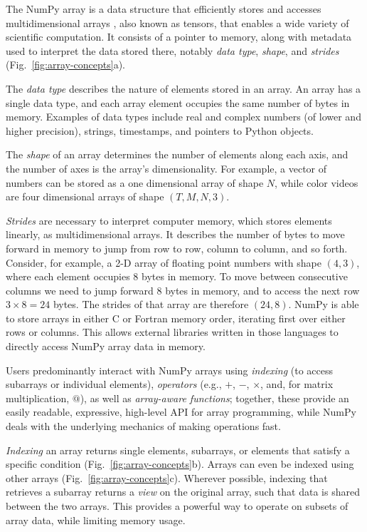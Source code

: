 The NumPy array is a data structure that efficiently stores and accesses
multidimensional arrays \cite{vanderwalt2011numpy}, also known as tensors, that
enables a wide variety of scientific computation.
It consists of a pointer to memory, along with metadata used to interpret the
data stored there, notably {\em data type}, {\em shape}, and {\em strides}
(Fig.~\ref{fig:array-concepts}a).

The \emph{data type} describes the nature of elements stored in an array.
An array has a single data type, and each array element occupies the same
number of bytes in memory.
Examples of data types include real and complex numbers (of lower and higher
precision), strings, timestamps, and pointers to Python objects.

The \emph{shape} of an array determines the number of elements along each axis,
and the number of axes is the array's dimensionality.
For example, a vector of numbers can be stored as a one dimensional array of
shape $N$, while color videos are four dimensional arrays of shape
$(T, M, N, 3)$.

\emph{Strides} are necessary to interpret computer memory, which stores elements
linearly, as multidimensional arrays.
It describes the number of bytes to move forward in memory to jump from row to
row, column to column, and so forth.
Consider, for example, a 2-D array of floating point numbers with shape
$(4, 3)$, where each element occupies 8 bytes in memory.
To move between consecutive columns we need to jump forward 8 bytes in memory,
and to access the next row $3 \times 8 = 24$ bytes.
The strides of that array are therefore $(24, 8)$.  NumPy is able to
store arrays in either C or Fortran memory order, iterating
first over either rows or columns.  This allows external libraries
written in those languages to directly access NumPy array data in memory.

Users predominantly interact with NumPy arrays using {\em indexing} (to access
subarrays or individual elements), {\em operators} (e.g., $+$, $-$, $\times$,
and, for matrix multiplication, $@$), as well as {\em array-aware functions};
together, these provide an easily readable, expressive, high-level API for
array programming, while NumPy
deals with the underlying mechanics of making operations fast.

\emph{Indexing} an array returns single elements, subarrays, or elements that satisfy
a specific condition (Fig.~\ref{fig:array-concepts}b).
Arrays can even be indexed using other arrays (Fig.~\ref{fig:array-concepts}c).
Wherever possible, indexing that retrieves a subarray returns a {\em view} on
the original array, such that data is shared between the two arrays.
This provides a powerful way to operate on subsets of array data, while
limiting memory usage.

